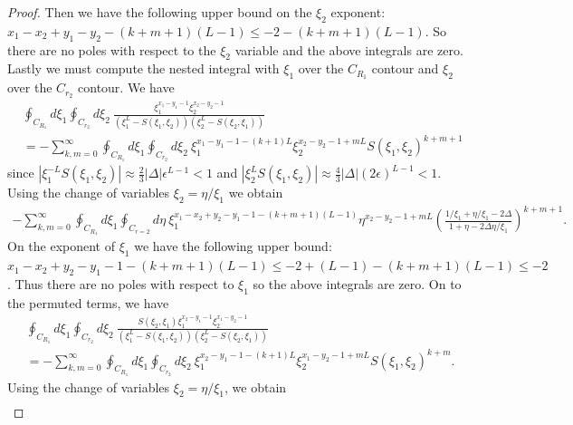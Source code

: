 \documentclass[a4paper,11pt]{article}
\theoremstyle{definition}
\begin{document}
\begin{proof}
 Then we have the following upper bound on the $\xi_2$ exponent: $x_1-x_2+y_1-y_2-(k+m+1)(L-1)\leq -2-(k+m+1)(L-1)$. So there are no poles with respect to the $\xi_2$ variable and the above integrals are zero. Lastly we must compute the nested integral with $\xi_1$ over the $C_{R_1}$ contour and $\xi_2$ over the $C_{r_2}$ contour. We have 
 \begin{equation}
     \begin{split}
         &\oint_{C_{R_1}}d\xi_1\oint_{C_{r_2}}d\xi_2 \ \frac{\xi_1^{x_1-y_1-1}\xi_2^{x_2-y_2-1}}{\left( \xi_1^L-S(\xi_1,\xi_2) \right)\left( \xi_2^L-S(\xi_2,\xi_1) \right)} \\
         &= -\sum_{k,m=0}^{\infty}\oint_{C_{R_1}}d\xi_1\oint_{C_{r_2}}d\xi_2 \ \xi_1^{x_1-y_1-1-(k+1)L}\xi_2^{x_2-y_2-1+mL}S(\xi_1,\xi_2)^{k+m+1}
     \end{split}
 \end{equation}
 since $|\xi_1^{-L}S(\xi_1,\xi_2)|\approx \frac23|\Delta|\epsilon^{L-1}<1$ and $|\xi_2^LS(\xi_1,\xi_2)|\approx \frac43|\Delta| (2\epsilon)^{L-1}<1$. Using the change of variables $\xi_2=\eta/\xi_1$ we obtain 
 \begin{equation}
     \begin{split}
         -\sum_{k,m=0}^{\infty}\oint_{C_{R_1}}d\xi_1\oint_{C_{r=2}}d\eta \ \xi_1^{x_1-x_2+y_2-y_1-1-(k+m+1)(L-1)}\eta^{x_2-y_2-1+mL}\left(\frac{1/\xi_1+\eta/\xi_1-2\Delta}{1+\eta-2\Delta\eta/\xi_1}\right)^{k+m+1}.
     \end{split}
 \end{equation}
 On the exponent of $\xi_1$ we have the following upper bound: $x_1-x_2+y_2-y_1-1-(k+m+1)(L-1) \leq -2 +(L-1) -(k+m+1)(L-1)\leq -2$. Thus there are no poles with respect to $\xi_1$ so the above integrals are zero. On to the permuted terms, we have
 \begin{equation}
     \begin{split}
         &\oint_{C_{R_1}}d\xi_1\oint_{C_{r_2}}d\xi_2 \ \frac{S(\xi_2,\xi_1)\xi_1^{x_2-y_1-1}\xi_2^{x_1-y_2-1}}{\left( \xi_1^L-S(\xi_1,\xi_2) \right)\left( \xi_2^L-S(\xi_2,\xi_1) \right)} \\
         &= -\sum_{k,m=0}^{\infty}\oint_{C_{R_1}}d\xi_1\oint_{C_{r_2}}d\xi_2 \ \xi_1^{x_2-y_1-1-(k+1)L}\xi_2^{x_1-y_2-1+mL}S(\xi_1,\xi_2)^{k+m}.
     \end{split}
 \end{equation}
Using the change of variables $\xi_2=\eta/\xi_1$, we obtain
\begin{equation}
    \begin{split}

\end{split}
\end{equation}
\end{proof}
\end{document}

